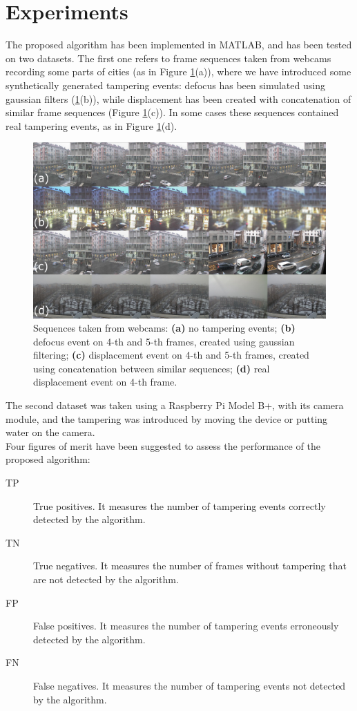 \documentclass{llncs}
\begin{document}
\section{Experiments}\label{sec:experiments}
The proposed algorithm has been implemented in MATLAB, and has been tested on two datasets.
The first one refers to frame sequences taken from webcams recording some parts of cities (as in Figure \ref{fig:sequences}(a)), where we have introduced some synthetically generated tampering events:
defocus has been simulated using gaussian filters (\ref{fig:sequences}(b)), while displacement has been created with concatenation of similar frame sequences (Figure \ref{fig:sequences}(c)).
In some cases these sequences contained real tampering events, as in Figure \ref{fig:sequences}(d).\\
\begin{figure}[t]
\centering
\includegraphics[width=1\linewidth]{Immagini/sequenze}
\caption{Sequences taken from webcams: \textbf{(a)} no tampering events; \textbf{(b)} defocus event on 4-th and 5-th frames, created using gaussian filtering; \textbf{(c)} displacement event on 4-th and 5-th frames, created using concatenation between similar sequences; \textbf{(d)} real displacement event on 4-th frame.}
\label{fig:sequences}
\end{figure}
The second dataset was taken using a Raspberry Pi Model B+, with its camera module, and the tampering was introduced by moving the device or putting water on the camera.\\
Four figures of merit have been suggested to assess the performance of the proposed algorithm:\\
\begin{description}
	\item[TP]  True positives. It measures the number of tampering events correctly detected by the algorithm.\\ 
	\item[TN]  True negatives. It measures the number of frames without tampering that are not detected by the algorithm. \\ 
	\item[FP]  False positives. It measures the number of tampering events erroneously detected by the algorithm.\\ 
	\item[FN]  False negatives. It measures the number of tampering events not detected by the algorithm. \\ 
\end{description} 
\end{document}
